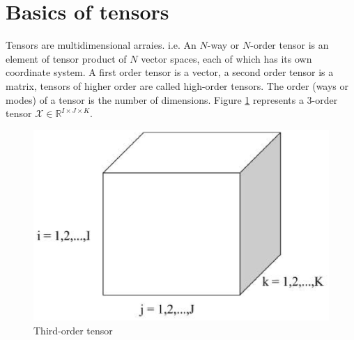 \documentclass[letterpaper,12pt]{article}
\begin{document}
  



\clearpage


\clearpage

\tableofcontents

\newpage

\section{Basics of tensors}

Tensors are multidimensional arraies. i.e. An $N$-way or $N$-order tensor is an element of tensor product of $N$ vector spaces, each of which has its own coordinate system. A first order tensor is a vector, a second order tensor is a matrix, tensors of higher order are called high-order tensors. The order (ways or modes) of a tensor is the number of dimensions. Figure \ref{fig:3tensor} represents a 3-order tensor $\mathcal{X}\in\mathbb{R}^{I\times J\times K}$.

\begin{figure}[!ht]
\centering
 \includegraphics[scale=0.4]{Images/3rd-order_tensor.eps}
 \caption{Third-order tensor}\label{fig:3tensor}
\end{figure}
\end{document}
